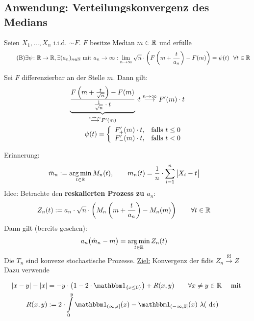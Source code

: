 \subsection{Anwendung: Verteilungskonvergenz des Medians} %
Seien $X_1,\ldots,X_n$ i.i.d. $\sim F$.
$F$ besitze Median $m\in\mathbb{R}$ und erfülle
\begin{align}\label{eqAnwendungVerteilungskonv_B}\tag{B}
	\exists\psi\colon\mathbb{R}\to\mathbb{R},\exists(a_n)_{n\in\mathbb{N}}\text{ mit } a_n\to\infty:
	\lim\limits_{n\to\infty}\sqrt{n}\cdot\left(F\left(m+\frac{t}{a_n}\right)-F(m)\right)=\psi(t)
	~~\forall t\in\mathbb{R}
\end{align}

\begin{beisp} %
	Sei $F$ differenzierbar an der Stelle $m$.
	Dann gilt:
	\begin{align*}
		\underbrace{\frac{F\left(m+\frac{t}{\sqrt{n}}\right)-F(m)}{\frac{1}{\sqrt{n}}\cdot t}}_{
			\overset{n\to\infty}{\longrightarrow}F'(m)
		}\cdot t
		\overset{n\to\infty}{\longrightarrow}F'(m)\cdot t\\
		\psi(t)=\left\lbrace\begin{array}{cl}
			F_+'(m)\cdot t, &\text{falls } t\leq 0\\
			F_-'(m)\cdot t,&\text{falls } t<0
		\end{array}\right.
	\end{align*}
\end{beisp}

Erinnerung:
\begin{align*}
	\hat{m}_n&:=\operatorname*{arg\,min}\limits_{t\in\mathbb{R}} M_n(t),\qquad
	m_n(t)=\frac{1}{n}\cdot\sum\limits_{i=1}^n\big|X_i-t\big|
\end{align*}
Idee: Betrachte den \textbf{reskalierten Prozess zu $a_n$}:
\begin{align*}
	Z_n(t)&:=a_n\cdot\sqrt{n}\cdot\left(M_n\left(m+\frac{t}{a_n}\right)-M_n(m)\right)\qquad\forall t\in\mathbb{R}
\end{align*}
Dann gilt (bereits gesehen):
\begin{align*}
	a_n\big(\hat{m}_n-m\big)
	&=\operatorname*{arg\,min}\limits_{t\in\mathbb{R}} Z_n(t)
\end{align*}
Die $T_n$ sind konvexe stochastische Prozesse.
\underline{Ziel:} Konvergenz der fidis $Z_n\overset{\text{fd}}{\longrightarrow}Z$\\
Dazu verwende

\begin{lemma}\label{lemma10.5KeithKnight}
	\begin{align*}
		|x-y|-|x|&=-y\cdot\left(1-2\cdot\indi_{\lbrace x\leq 0\rbrace}\right)+R(x,y)
		\qquad\forall x\neq y\in\R\quad\mit\\
		R(x,y)&:=2\cdot\int\limits_0^y\indi_{(\infty,s]}(x)-\indi_{(-\infty,0]}(x)~\lambda(\d s)
	\end{align*}
\end{lemma}

